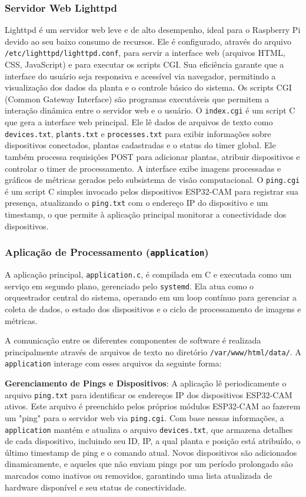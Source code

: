 \documentclass[12pt, a4paper]{article}
\begin{document}
	\subsubsection{Servidor Web Lighttpd}
	Lighttpd é um servidor web leve e de alto desempenho, ideal para o Raspberry Pi devido ao seu baixo consumo de recursos. Ele é configurado, através do arquivo \texttt{/etc/lighttpd/lighttpd.conf}, para servir a interface web (arquivos HTML, CSS, JavaScript) e para executar os scripts CGI. Sua eficiência garante que a interface do usuário seja responsiva e acessível via navegador, permitindo a visualização dos dados da planta e o controle básico do sistema. Os scripts CGI (Common Gateway Interface) são programas executáveis que permitem a interação dinâmica entre o servidor web e o usuário. O \texttt{index.cgi} é um script C que gera a interface web principal. Ele lê dados de arquivos de texto como \texttt{devices.txt}, \texttt{plants.txt} e \texttt{processes.txt} para exibir informações sobre dispositivos conectados, plantas cadastradas e o status do timer global. Ele também processa requisições POST para adicionar plantas, atribuir dispositivos e controlar o timer de processamento. A interface exibe imagens processadas e gráficos de métricas gerados pelo subsistema de visão computacional. O \texttt{ping.cgi} é um script C simples invocado pelos dispositivos ESP32-CAM para registrar sua presença, atualizando o \texttt{ping.txt} com o endereço IP do dispositivo e um timestamp, o que permite à aplicação principal monitorar a conectividade dos dispositivos.
	
	\subsubsection{Aplicação de Processamento (\texttt{application})}
	A aplicação principal, \texttt{application.c}, é compilada em C e executada como um serviço em segundo plano, gerenciado pelo \texttt{systemd}. Ela atua como o orquestrador central do sistema, operando em um loop contínuo para gerenciar a coleta de dados, o estado dos dispositivos e o ciclo de processamento de imagens e métricas.
	
	A comunicação entre os diferentes componentes de software é realizada principalmente através de arquivos de texto no diretório \texttt{/var/www/html/data/}. A \texttt{application} interage com esses arquivos da seguinte forma:
	
	\textbf{Gerenciamento de Pings e Dispositivos}: A aplicação lê periodicamente o arquivo \texttt{ping.txt} para identificar os endereços IP dos dispositivos ESP32-CAM ativos. Este arquivo é preenchido pelos próprios módulos ESP32-CAM ao fazerem um "ping" para o servidor web via \texttt{ping.cgi}. Com base nessas informações, a \texttt{application} mantém e atualiza o arquivo \texttt{devices.txt}, que armazena detalhes de cada dispositivo, incluindo seu ID, IP, a qual planta e posição está atribuído, o último timestamp de ping e o comando atual. Novos dispositivos são adicionados dinamicamente, e aqueles que não enviam pings por um período prolongado são marcados como inativos ou removidos, garantindo uma lista atualizada de hardware disponível e seu status de conectividade.
	
\end{document}
